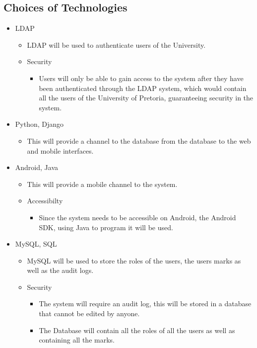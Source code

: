 \documentclass[12pt,a4paper]{article}
\begin{document}
\subsection{Choices of Technologies}
\begin{itemize}
	\item LDAP
		\begin{itemize}
			\item LDAP will be used to authenticate users of the University.
			\item Security
				\begin{itemize}
					\item Users will only be able to gain access to the system after they have been authenticated through the LDAP system, which would contain all the users of the University of Pretoria, guaranteeing security in the system.
				\end{itemize}
		\end{itemize}
	\item Python, Django
		\begin{itemize}
			\item This will provide a channel to the database from the database to the web and mobile interfaces.
		\end{itemize}
	\item Android, Java
		\begin{itemize}
			\item This will provide a mobile channel to the system.
			\item Accessibilty
				\begin{itemize}
					\item Since the system needs to be accessible on Android, the Android SDK, using Java to program it will be used.
				\end{itemize}
		\end{itemize}
	\item MySQL, SQL
		\begin{itemize}
			\item MySQL will be used to store the roles of the users, the users marks as well as the audit logs.
			\item Security
				\begin{itemize}
					\item The system will require an audit log, this will be stored in a database that cannot be edited by anyone.
					\item The Database will contain all the roles of all the users as well as containing all the marks.
				\end{itemize}

\end{itemize}
\end{itemize}
\end{document}

